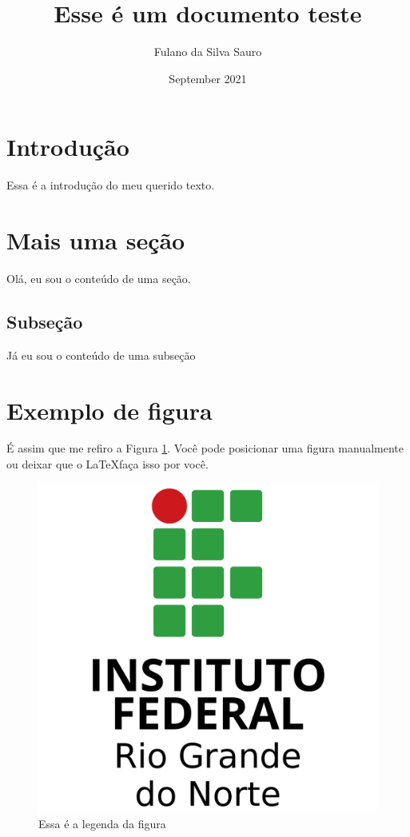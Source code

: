 \documentclass{article}
\title{Esse é um documento teste}
\author{Fulano da Silva Sauro}
\date{September 2021}
\begin{document}
\maketitle

\section{Introdução}

Essa é a introdução do meu querido texto.

\section{Mais uma seção}

Olá, eu sou o conteúdo de uma seção.

\subsection{Subseção}

Já eu sou o conteúdo de uma subseção

\section{Exemplo de figura}

É assim que me refiro a Figura \ref{fig:logo-ifrn}. Você pode posicionar uma figura manualmente ou deixar que o \LaTeX faça isso por você. 

\begin{figure}[h]
    \centering
    \includegraphics[scale=0.1]{if.png}
    \caption{Essa é a legenda da figura}
    \label{fig:logo-ifrn}
\end{figure}
\end{document}
